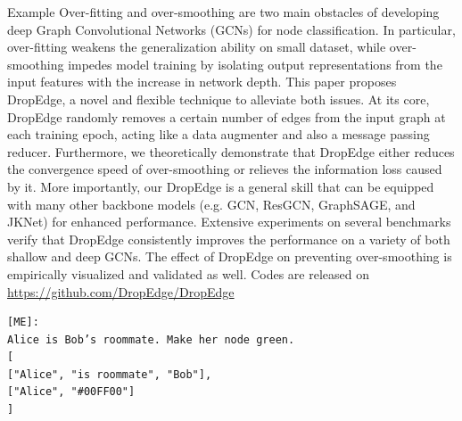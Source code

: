 \documentclass[aspectratio=1610,xcolor={dvipsnames},hyperref={colorlinks,unicode,linkcolor=violet,anchorcolor=BlueViolet,citecolor=YellowOrange,filecolor=black,urlcolor=Aquamarine}]{beamer}
\begin{document}
\begin{frame}{Example}
 Over-fitting and over-smoothing are two main obstacles of developing deep Graph Convolutional Networks (GCNs) for node classification. In particular, over-fitting weakens the generalization ability on small dataset, while over-smoothing impedes model training by isolating output representations from the input features with the increase in network depth.  This paper proposes DropEdge, a novel and flexible technique to alleviate both issues. At its core, DropEdge randomly removes a certain number of edges from the input graph at each training epoch, acting like a data augmenter and also a message passing reducer. Furthermore, we theoretically demonstrate that DropEdge either reduces the convergence speed of over-smoothing or relieves the information loss caused by it. More importantly, our DropEdge is a general skill that can be equipped with many other backbone models (e.g.  GCN, ResGCN, GraphSAGE, and JKNet) for enhanced performance.  Extensive experiments on several benchmarks verify that DropEdge consistently improves the performance on a variety of both shallow and deep GCNs.  The effect of DropEdge on preventing over-smoothing is empirically visualized and validated as well.  Codes are released on \url{https://github.com/DropEdge/DropEdge}


\begin{verbatim}
[ME]:
Alice is Bob’s roommate. Make her node green.
[
["Alice", "is roommate", "Bob"],
["Alice", "#00FF00"]
]


\end{verbatim}
\end{frame}
\end{document}
